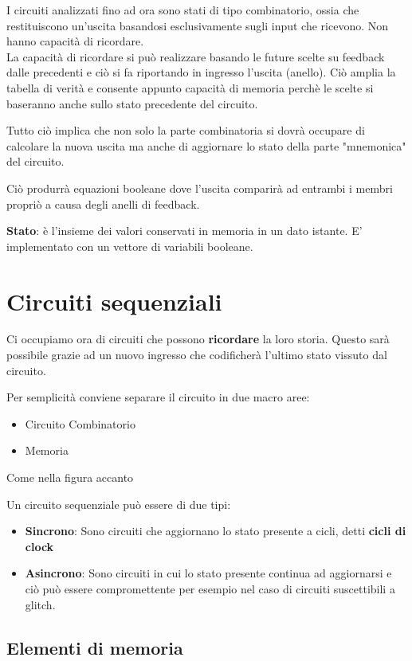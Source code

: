 \documentclass[a4paper]{book}
\begin{document}
I circuiti analizzati fino ad ora sono stati di tipo combinatorio, ossia che restituiscono un'uscita basandosi esclusivamente sugli input che ricevono.
Non hanno capacità di ricordare. \\
La capacità di ricordare si può realizzare basando le future scelte su feedback dalle precedenti e ciò si fa riportando in ingresso l'uscita (anello).
Ciò amplia la tabella di verità e consente appunto capacità di memoria perchè le scelte si baseranno anche sullo stato precedente del circuito.

Tutto ciò implica che non solo la parte combinatoria si dovrà occupare di calcolare la nuova uscita ma anche di aggiornare lo stato della parte "mnemonica" del circuito.

Ciò produrrà equazioni booleane dove l'uscita comparirà ad entrambi i membri propriò a causa degli anelli di feedback. 

\textbf{Stato}: è l'insieme dei valori conservati in memoria in un dato istante. E' implementato con un vettore di variabili booleane.



\section{Circuiti sequenziali}
Ci occupiamo ora di circuiti che possono \textbf{ricordare} la loro storia.
Questo sarà possibile grazie ad un nuovo ingresso che codificherà l'ultimo stato vissuto dal circuito.

Per semplicità conviene separare il circuito in due macro aree:

\begin{itemize}
\item Circuito Combinatorio
\item Memoria
\end{itemize}

Come nella figura accanto

Un circuito sequenziale può essere di due tipi:
\begin{itemize}
\item \textbf{Sincrono}: Sono circuiti che aggiornano lo stato presente a cicli, detti \textbf{cicli di clock}
\item \textbf{Asincrono}: Sono circuiti in cui lo stato presente continua ad aggiornarsi e ciò può essere compromettente per esempio nel caso di circuiti suscettibili a glitch.
\end{itemize}


\subsection{Elementi di memoria}
\end{document}
